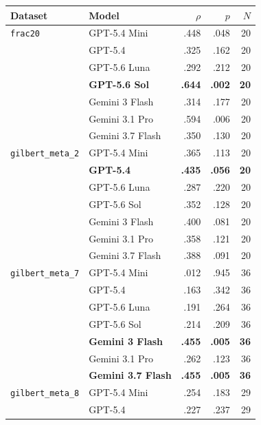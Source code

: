 \documentclass[11pt]{article}
\begin{document}
\begin{table}[p]
  \centering
  \small
  \setlength{\tabcolsep}{8pt}
  \begin{tabular}{llrrr}
    \toprule
    Dataset & Model & $\rho$ & $p$ & $N$ \\
    \midrule
    \texttt{frac20}
      & GPT-5.4 Mini       & .448  & .048 & 20 \\
      & GPT-5.4            & .325  & .162 & 20 \\
      & GPT-5.6 Luna       & .292  & .212 & 20 \\
      & \textbf{GPT-5.6 Sol} & \textbf{.644} & \textbf{.002} & \textbf{20} \\
      & Gemini 3 Flash     & .314  & .177 & 20 \\
      & Gemini 3.1 Pro     & .594  & .006 & 20 \\
      & Gemini 3.7 Flash   & .350  & .130 & 20 \\
    \addlinespace
    \texttt{gilbert\_meta\_2}
      & GPT-5.4 Mini       & .365  & .113 & 20 \\
      & \textbf{GPT-5.4}  & \textbf{.435} & \textbf{.056} & \textbf{20} \\
      & GPT-5.6 Luna       & .287  & .220 & 20 \\
      & GPT-5.6 Sol        & .352  & .128 & 20 \\
      & Gemini 3 Flash     & .400  & .081 & 20 \\
      & Gemini 3.1 Pro     & .358  & .121 & 20 \\
      & Gemini 3.7 Flash   & .388  & .091 & 20 \\
    \addlinespace
    \texttt{gilbert\_meta\_7}
      & GPT-5.4 Mini       & .012  & .945 & 36 \\
      & GPT-5.4            & .163  & .342 & 36 \\
      & GPT-5.6 Luna       & .191  & .264 & 36 \\
      & GPT-5.6 Sol        & .214  & .209 & 36 \\
      & \textbf{Gemini 3 Flash} & \textbf{.455} & \textbf{.005} & \textbf{36} \\
      & Gemini 3.1 Pro     & .262  & .123 & 36 \\
      & \textbf{Gemini 3.7 Flash} & \textbf{.455} & \textbf{.005} & \textbf{36} \\
    \addlinespace
    \texttt{gilbert\_meta\_8}
      & GPT-5.4 Mini       & .254  & .183 & 29 \\
      & GPT-5.4            & .227  & .237 & 29 \\

\end{tabular}
\end{table}
\end{document}
